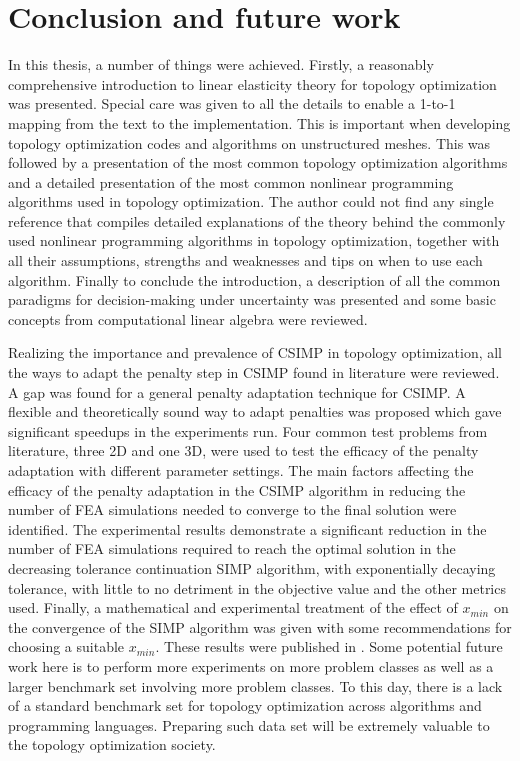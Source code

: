 \chapter{Conclusion and future work}\thispagestyle{EmptyHeader}
\label{chp:5}

In this thesis, a number of things were achieved. Firstly, a reasonably comprehensive introduction to linear elasticity theory for topology optimization was presented. Special care was given to all the details to enable a 1-to-1 mapping from the text to the implementation. This is important when developing topology optimization codes and algorithms on unstructured meshes. This was followed by a presentation of the most common topology optimization algorithms and a detailed presentation of the most common nonlinear programming algorithms used in topology optimization. The author could not find any single reference that compiles detailed explanations of the theory behind the commonly used nonlinear programming algorithms in topology optimization, together with all their assumptions, strengths and weaknesses and tips on when to use each algorithm. Finally to conclude the introduction, a description of all the common paradigms for decision-making under uncertainty was presented and some basic concepts from computational linear algebra were reviewed.

Realizing the importance and prevalence of CSIMP in topology optimization, all the ways to adapt the penalty step in CSIMP found in literature were reviewed. A gap was found for a general penalty adaptation technique for CSIMP. A flexible and theoretically sound way to adapt penalties was proposed which gave significant speedups in the experiments run. Four common test problems from literature, three 2D and one 3D, were used to test the efficacy of the penalty adaptation with different parameter settings. The main factors affecting the efficacy of the penalty adaptation in the CSIMP algorithm in reducing the number of FEA simulations needed to converge to the final solution were identified. The experimental results demonstrate a significant reduction in the number of FEA simulations required to reach the optimal solution in the decreasing tolerance continuation SIMP algorithm, with exponentially decaying tolerance, with little to no detriment in the objective value and the other metrics used. Finally, a mathematical and experimental treatment of the effect of $x_{min}$ on the convergence of the SIMP algorithm was given with some recommendations for choosing a suitable $x_{min}$. These results were published in \cite{TAREK2020112880}. Some potential future work here is to perform more experiments on more problem classes as well as a larger benchmark set involving more problem classes. To this day, there is a lack of a standard benchmark set for topology optimization across algorithms and programming languages. Preparing such data set will be extremely valuable to the topology optimization society.

